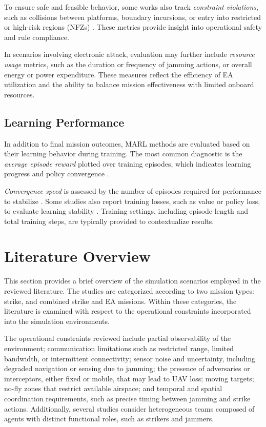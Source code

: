To ensure safe and feasible behavior, some works also track \textit{constraint violations}, such as collisions between platforms, boundary incursions, or entry into restricted or high-risk regions (NFZs) \cite{Wang2025CooperativeUAV, yuksek2021cooperative}. These metrics provide insight into operational safety and rule compliance.

In scenarios involving electronic attack, evaluation may further include \textit{resource usage} metrics, such as the duration or frequency of jamming actions, or overall energy or power expenditure. These measures reflect the efficiency of EA utilization and the ability to balance mission effectiveness with limited onboard resources.

\subsection{Learning Performance}

In addition to final mission outcomes, MARL methods are evaluated based on their learning behavior during training. The most common diagnostic is the \textit{average episode reward} plotted over training episodes, which indicates learning progress and policy convergence \cite{Lee2023MUMTSEAD, Fang2021CollaborativeCombat}. 

\textit{Convergence speed} is assessed by the number of episodes required for performance to stabilize \cite{xu2025mdrl_uav_combat}. Some studies also report training losses, such as value or policy loss, to evaluate learning stability \cite{Lee2023MUMTSEAD}. Training settings, including episode length and total training steps, are typically provided to contextualize results.



\section{Literature Overview}
This section provides a brief overview of the simulation scenarios employed in the reviewed literature. The studies are categorized according to two mission types: strike, and combined strike and EA missions. Within these categories, the literature is examined with respect to the operational constraints incorporated into the simulation environments.

The operational constraints reviewed include partial observability of the environment; communication limitations such as restricted range, limited bandwidth, or intermittent connectivity; sensor noise and uncertainty, including degraded navigation or sensing due to jamming; the presence of adversaries or interceptors, either fixed or mobile, that may lead to UAV loss; moving targets; no-fly zones that restrict available airspace; and temporal and spatial coordination requirements, such as precise timing between jamming and strike actions. Additionally, several studies consider heterogeneous teams composed of agents with distinct functional roles, such as strikers and jammers.

